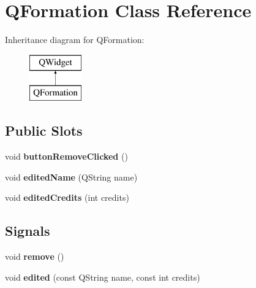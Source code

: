 \hypertarget{classQFormation}{\section{Q\+Formation Class Reference}
\label{classQFormation}
}
Inheritance diagram for Q\+Formation\+:\begin{figure}[H]
\begin{center}
\leavevmode
\includegraphics[height=2.000000cm]{classQFormation}
\end{center}
\end{figure}
\subsection*{Public Slots}
\begin{DoxyCompactItemize}
\item 
\hypertarget{classQFormation_a370fb5cd5d5867a27c678847d3913ad9}{void {\bfseries button\+Remove\+Clicked} ()}\label{classQFormation_a370fb5cd5d5867a27c678847d3913ad9}

\item 
\hypertarget{classQFormation_ac2be6e760b1049ec80bec61ecf1ada63}{void {\bfseries edited\+Name} (Q\+String name)}\label{classQFormation_ac2be6e760b1049ec80bec61ecf1ada63}

\item 
\hypertarget{classQFormation_ae7e30ca7fad2caabda0e092e9344e4f9}{void {\bfseries edited\+Credits} (int credits)}\label{classQFormation_ae7e30ca7fad2caabda0e092e9344e4f9}

\end{DoxyCompactItemize}
\subsection*{Signals}
\begin{DoxyCompactItemize}
\item 
\hypertarget{classQFormation_a79fbef8124cc0a48c01cac1d38b6f3e7}{void {\bfseries remove} ()}\label{classQFormation_a79fbef8124cc0a48c01cac1d38b6f3e7}

\item 
\hypertarget{classQFormation_a8c623f0e0278e69e42947b9af6913f14}{void {\bfseries edited} (const Q\+String name, const int credits)}\label{classQFormation_a8c623f0e0278e69e42947b9af6913f14}

\end{DoxyCompactItemize}
